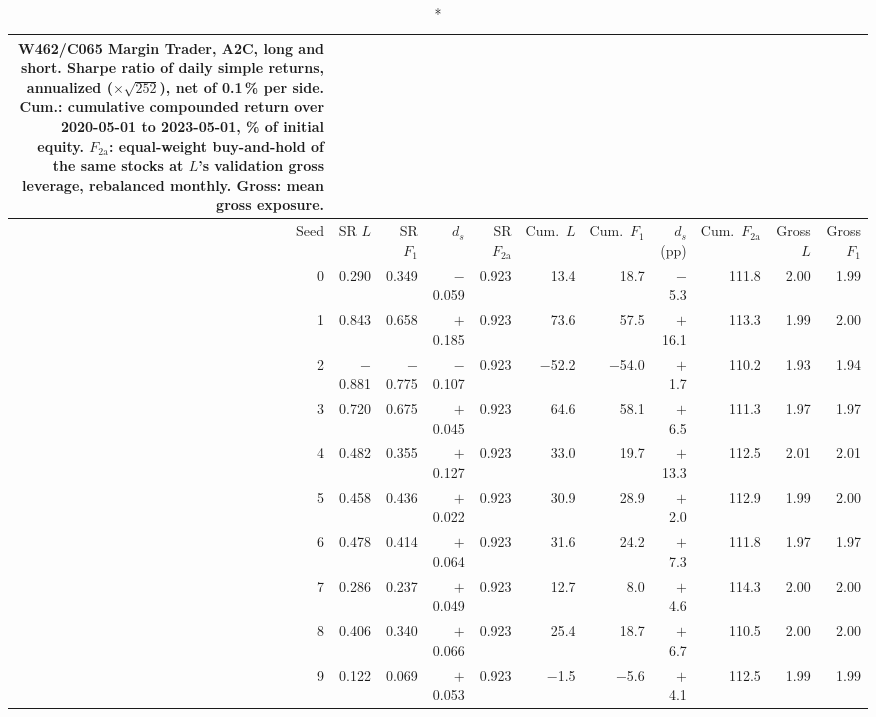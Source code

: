 \begin{longtable}{@{}rrrrrrrrrrr@{}}
\caption*{\small W462/C065 Margin Trader, A2C, long and short. Sharpe ratio of daily simple returns, annualized ($\times\sqrt{252}$), net of 0.1\,\% per side. Cum.: cumulative compounded return over 2020-05-01 to 2023-05-01, \% of initial equity. $F_{2\mathrm{a}}$: equal-weight buy-and-hold of the same stocks at $L$'s validation gross leverage, rebalanced monthly. Gross: mean gross exposure.}\\
\toprule
Seed & SR $L$ & SR $F_1$ & $d_s$ & SR $F_{2\mathrm{a}}$ & Cum.\ $L$ & Cum.\ $F_1$ & $d_s$ (pp) & Cum.\ $F_{2\mathrm{a}}$ & Gross $L$ & Gross $F_1$\\ \midrule\endhead
0 & 0.290 & 0.349 & $-$0.059 & 0.923 & 13.4 & 18.7 & $-$5.3 & 111.8 & 2.00 & 1.99\\
1 & 0.843 & 0.658 & $+$0.185 & 0.923 & 73.6 & 57.5 & $+$16.1 & 113.3 & 1.99 & 2.00\\
2 & $-$0.881 & $-$0.775 & $-$0.107 & 0.923 & $-$52.2 & $-$54.0 & $+$1.7 & 110.2 & 1.93 & 1.94\\
3 & 0.720 & 0.675 & $+$0.045 & 0.923 & 64.6 & 58.1 & $+$6.5 & 111.3 & 1.97 & 1.97\\
4 & 0.482 & 0.355 & $+$0.127 & 0.923 & 33.0 & 19.7 & $+$13.3 & 112.5 & 2.01 & 2.01\\
5 & 0.458 & 0.436 & $+$0.022 & 0.923 & 30.9 & 28.9 & $+$2.0 & 112.9 & 1.99 & 2.00\\
6 & 0.478 & 0.414 & $+$0.064 & 0.923 & 31.6 & 24.2 & $+$7.3 & 111.8 & 1.97 & 1.97\\
7 & 0.286 & 0.237 & $+$0.049 & 0.923 & 12.7 & 8.0 & $+$4.6 & 114.3 & 2.00 & 2.00\\
8 & 0.406 & 0.340 & $+$0.066 & 0.923 & 25.4 & 18.7 & $+$6.7 & 110.5 & 2.00 & 2.00\\
9 & 0.122 & 0.069 & $+$0.053 & 0.923 & $-$1.5 & $-$5.6 & $+$4.1 & 112.5 & 1.99 & 1.99\\
\bottomrule\end{longtable}
